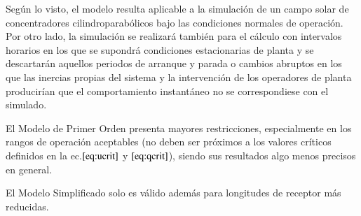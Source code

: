 Según lo visto, el modelo resulta aplicable a la simulación de un campo solar de concentradores cilindroparabólicos bajo las condiciones normales de operación. Por otro lado, la simulación se realizará también para el cálculo con intervalos horarios en los que se supondrá condiciones estacionarias de planta y se descartarán aquellos periodos de arranque y parada o cambios abruptos en los que las inercias propias del sistema y la intervención de los operadores de planta producirían que el comportamiento instantáneo no se correspondiese con el simulado.

El Modelo de Primer Orden presenta mayores restricciones, especialmente en los rangos de operación aceptables (no deben ser próximos a los valores críticos definidos en la ec.\(\eqref{eq:ucrit}\) y \(\eqref{eq:qcrit}\)), siendo sus resultados algo menos precisos en general.

El Modelo Simplificado solo es válido además para longitudes de receptor más reducidas.
